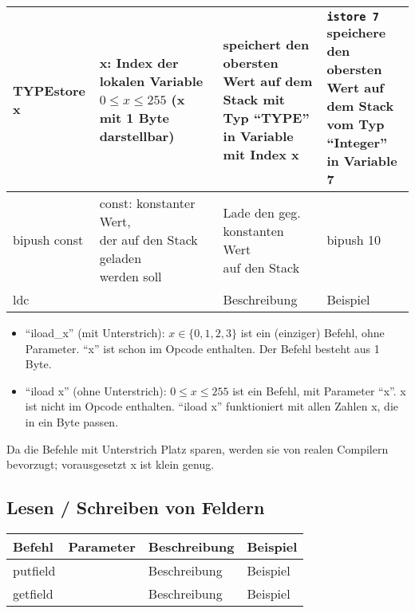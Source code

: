 \begin{table}[h]
\begin{tabular}{l|l|l|l}
		\textbf{TYPE}store x	& \multlineTable{x: Index der lokalen\\ Variable $0 \leq x \leq 255$\\ (x mit 1 Byte darstellbar) }	&	\multlineTable{speichert den obersten Wert auf dem\\ Stack mit Typ \enquote{TYPE} in Variable\\ mit Index x}	& \multlineTable{\texttt{istore 7}\\ speichere den obersten Wert auf\\ dem Stack vom Typ \enquote{Integer}\\ in Variable 7}	\\ \hline	
		
		bipush const& \multlineTable{const: konstanter Wert,\\ der auf den Stack geladen\\ werden soll} & \multlineTable{Lade den geg. konstanten Wert\\ auf den Stack} & \multlineTable{bipush 10\\} \\ \hline	
		
		ldc & \open  & Beschreibung & Beispiel \\ \hline
	\end{tabular}
\end{table}
\begin{itemize}
	\item \enquote{iload\_x} (mit Unterstrich): $x \in \{ 0,1,2,3 \}$ ist ein (einziger) Befehl, ohne Parameter. \enquote{x} ist schon im Opcode enthalten. Der Befehl besteht aus 1 Byte.
	\item \enquote{iload x} (ohne Unterstrich): $0 \leq x \leq 255$ ist ein Befehl, mit Parameter \enquote{x}. x ist nicht im Opcode enthalten. \enquote{iload x} funktioniert mit allen Zahlen x, die in ein Byte passen.
\end{itemize}
Da die Befehle mit Unterstrich Platz sparen, werden sie von realen Compilern bevorzugt; vorausgesetzt x ist klein genug.

\subsection{Lesen / Schreiben von Feldern}
\begin{table}[h]
	\centering
	\label{my-label}
	\begin{tabular}{l|l|l|l}
		Befehl & Parameter & Beschreibung & Beispiel \\ \hline
		
		putfield & \open & Beschreibung & Beispiel \\ \hline	
		
		getfield & \open & Beschreibung & Beispiel \\ \hline		
		
	\end{tabular}
\end{table}

